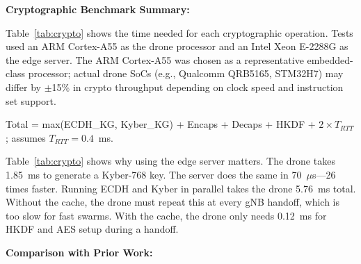 \documentclass{ieeeaccess}
\begin{document}
\vspace{2mm}\noindent\textbf{Cryptographic Benchmark Summary:}

Table~\ref{tab:crypto} shows the time needed for each cryptographic operation. Tests used an ARM Cortex-A55 as the drone processor and an Intel Xeon E-2288G as the edge server. The ARM Cortex-A55 was chosen as a representative embedded-class processor; actual drone SoCs (e.g., Qualcomm QRB5165, STM32H7) may differ by $\pm$15\% in crypto throughput depending on clock speed and instruction set support.

\begin{table}[ht]
\caption{Cryptographic Operation Latency: Drone Processor vs. Edge Server}
\label{tab:crypto}
\begin{center}
\end{center}
\vspace{1mm}
{\footnotesize Total = max(ECDH\_KG, Kyber\_KG) + Encaps + Decaps + HKDF + $2 \times T_{RTT}$; assumes $T_{RTT} = 0.4$~ms.}
\end{table}

Table~\ref{tab:crypto} shows why using the edge server matters. The drone takes 1.85~ms to generate a Kyber-768 key. The server does the same in 70~$\mu$s---26 times faster. Running ECDH and Kyber in parallel takes the drone 5.76~ms total. Without the cache, the drone must repeat this at every gNB handoff, which is too slow for fast swarms. With the cache, the drone only needs 0.12~ms for HKDF and AES setup during a handoff.

\vspace{2mm}\noindent\textbf{Comparison with Prior Work:}
\end{document}
